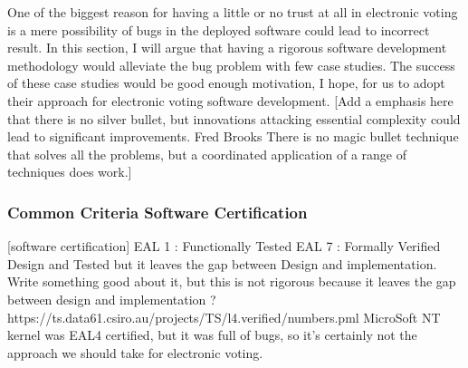 	
	One of the biggest reason for having a little or no trust at all 
	in electronic voting is a mere possibility of bugs in 
	the deployed software could lead to incorrect result.  
	In this section, I will argue that 
	having a rigorous software development methodology would alleviate 
	the bug problem with few case studies. The success of these 
	case studies would be good enough motivation, I hope, for us to 
	adopt their approach for electronic voting software development. 
    [Add a emphasis here that there is no silver bullet, but 
     innovations attacking essential complexity could lead to
     significant improvements. Fred Brooks 
     There  is  no magic bullet technique that solves all the 
     problems, but a coordinated  application  of  a  
     range  of  techniques  does work.] 	
	
	\subsubsection{Common Criteria Software Certification}    	
	[software certification]
	EAL 1 : Functionally Tested 
	EAL 7 : Formally Verified Design and Tested
	but it leaves the gap between Design and implementation.
	Write something good about it, but this is not rigorous because 
	it leaves the gap between design and implementation ? 
	https://ts.data61.csiro.au/projects/TS/l4.verified/numbers.pml	
	MicroSoft NT kernel was EAL4 certified, but it was full of bugs, 
	so it's certainly not the approach we should take for electronic 
	voting.		    
		    
